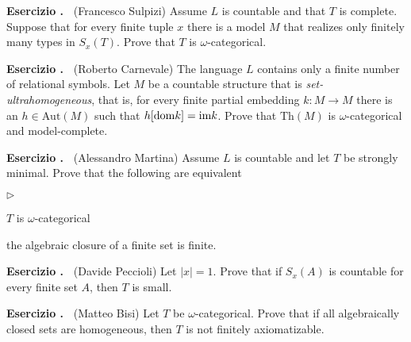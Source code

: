 \documentclass[10pt]{article}
\def\range{\textrm{im}}
\def\Aut{\textrm{Aut}}
\def\Th{\textrm{Th}}
\def\dom{{\rm dom}}
\newcommand{\labella}[1]{{\sf\footnotesize #1}\hfill}
\renewenvironment{itemize}
  {\begin{list}{$\triangleright$}{%
   \setlength{\parskip}{0mm}
   \setlength{\topsep}{0mm}
   \setlength{\rightmargin}{0mm}
   \setlength{\listparindent}{0mm}
   \setlength{\itemindent}{0mm}
   \setlength{\labelwidth}{3ex}
   \setlength{\itemsep}{0mm}
   \setlength{\parsep}{0mm}
   \setlength{\partopsep}{0mm}
   \setlength{\labelsep}{1ex}
   \setlength{\leftmargin}{\labelwidth+\labelsep}
   \let\makelabel\labella}}{%
   \vspace*{-.3\baselineskip}
  \end{list}}
\newcounter{ex}
\newenvironment{exercise}{\bigskip\addtocounter{ex}{1}\textbf{Esercizio \theex.\ }}{}
\begin{document}

\begin{exercise} 
  (Francesco Sulpizi)
  Assume $L$ is countable and that $T$ is complete.
  Suppose that for every finite tuple $x$ there is a model $M$ that realizes only finitely many types in $S_x(T)$.
  Prove that $T$ is $\omega$-categorical.
\end{exercise}

\begin{exercise}
  (Roberto Carnevale)
  The language $L$ contains only a finite number of relational symbols.
  Let $M$ be a countable structure that is \textit{set-ultrahomogeneous}, that is,  for every finite partial embedding $k:M\to M$ there is an $h\in\Aut(M)$ such that $h[\dom k]=\range k$.
  Prove that $\Th(M)$ is $\omega$-categorical and model-complete.
\end{exercise}

\begin{exercise}
  (Alessandro Martina)
  Assume $L$ is countable and let $T$ be strongly minimal.
  Prove that the following are equivalent
  \begin{itemize}
  \item[1.] $T$ is $\omega$-categorical
  \item[2.] the algebraic closure of a finite set is finite.
  \end{itemize}
\end{exercise}

\begin{exercise}
  (Davide Peccioli)
Let $|x|=1$.
Prove that if $S_{x}(A)$ is countable for every finite set $A$, then $T$ is small.
\end{exercise}

\begin{exercise}
  (Matteo Bisi)
  Let $T$ be $\omega$-categorical.
  Prove that if all algebraically closed sets are homogeneous, then $T$ is not finitely axiomatizable.
\end{exercise}
\end{document}
